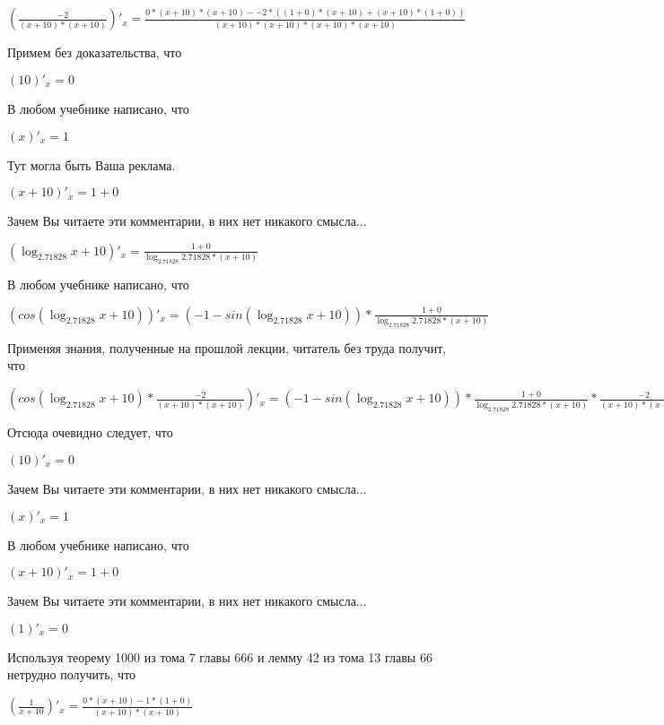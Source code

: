 \documentclass[12pt,a4paper,fleqn]{article}
\theoremstyle{definition}
\begin{document}
$(\frac{ -2 }{( x  +  10 ) * ( x  +  10 )}
)'_{x} = \frac{ 0  * ( x  +  10 ) * ( x  +  10 ) -  -2  * (( 1  +  0 ) * ( x  +  10 ) + ( x  +  10 ) * ( 1  +  0 ))}{( x  +  10 ) * ( x  +  10 ) * ( x  +  10 ) * ( x  +  10 )}
$

Примем без доказательства, что 

$( 10 )'_{x} =  0 $

В любом учебнике написано, что 

$( x )'_{x} =  1 $

Тут могла быть Ваша реклама. 

$( x  +  10 )'_{x} =  1  +  0 $

Зачем Вы читаете эти комментарии, в них нет никакого смысла... 

$(\log_{ 2.71828 }{ x  +  10 })'_{x} = \frac{ 1  +  0 }{\log_{ 2.71828 }{ 2.71828 } * ( x  +  10 )}
$

В любом учебнике написано, что 

$(cos(\log_{ 2.71828 }{ x  +  10 }))'_{x} = ( -1  - sin(\log_{ 2.71828 }{ x  +  10 })) * \frac{ 1  +  0 }{\log_{ 2.71828 }{ 2.71828 } * ( x  +  10 )}
$

Применяя знания, полученные на прошлой лекции, читатель без труда получит, что 

$(cos(\log_{ 2.71828 }{ x  +  10 }) * \frac{ -2 }{( x  +  10 ) * ( x  +  10 )}
)'_{x} = ( -1  - sin(\log_{ 2.71828 }{ x  +  10 })) * \frac{ 1  +  0 }{\log_{ 2.71828 }{ 2.71828 } * ( x  +  10 )}
 * \frac{ -2 }{( x  +  10 ) * ( x  +  10 )}
 + cos(\log_{ 2.71828 }{ x  +  10 }) * \frac{ 0  * ( x  +  10 ) * ( x  +  10 ) -  -2  * (( 1  +  0 ) * ( x  +  10 ) + ( x  +  10 ) * ( 1  +  0 ))}{( x  +  10 ) * ( x  +  10 ) * ( x  +  10 ) * ( x  +  10 )}
$

Отсюда очевидно следует, что 

$( 10 )'_{x} =  0 $

Зачем Вы читаете эти комментарии, в них нет никакого смысла... 

$( x )'_{x} =  1 $

В любом учебнике написано, что 

$( x  +  10 )'_{x} =  1  +  0 $

Зачем Вы читаете эти комментарии, в них нет никакого смысла... 

$( 1 )'_{x} =  0 $

Используя теорему 1000 из тома 7 главы 666 и лемму 42 из тома 13 главы 66 нетрудно получить, что 

$(\frac{ 1 }{ x  +  10 }
)'_{x} = \frac{ 0  * ( x  +  10 ) -  1  * ( 1  +  0 )}{( x  +  10 ) * ( x  +  10 )}
$
\end{document}
